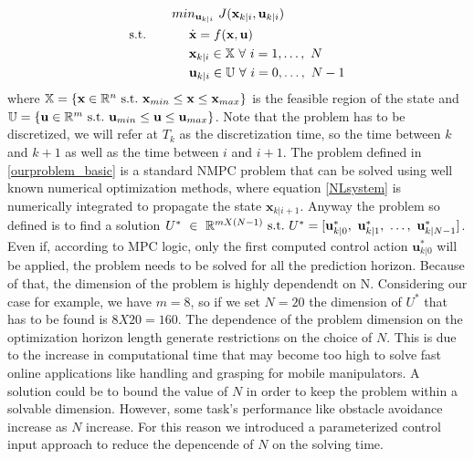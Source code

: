 \begin{equation} \label{ourproblem_basic}
\begin{split}
		& min_{\textbf{u}_{k|i}}\ J(\textbf{x}_{k|i},\textbf{u}_{k|i}) \\
		\textnormal{s.t.}\qquad
		&\ \ \ \ \dot{\textbf{x}}=f(\textbf{x},\textbf{u}) \\
		&\ \ \ \ \textbf{x}_{k|i} \in \mathbb{X}\ \forall\ i=1,\dots,\ N  \\
		&\ \ \ \ \textbf{u}_{k|i} \in \mathbb{U}\ \forall\ i=0,\dots,\ N-1 \\
	\end{split}	
\end{equation}
where $\mathbb{X} = \lbrace \textbf{x}\in \mathbb{R}^n\ \textnormal{s.t.}\ \textbf{x}_{min}\leq\textbf{x}\leq\textbf{x}_{max} \rbrace $ is the feasible region of the state and $\mathbb{U} = \lbrace \textbf{u}\in \mathbb{R}^m\ \textnormal{s.t.}\ \textbf{u}_{min}\leq\textbf{u}\leq\textbf{u}_{max} \rbrace $.
Note that the problem has to be discretized, we will refer at $T_k$ as the discretization time, so the time between $k$ and $k+1$ as well as the time between $i$ and $i+1$.
The problem defined in \ref{ourproblem_basic} is a standard NMPC problem that can be solved using well known numerical optimization methods, where equation \ref{NLsystem} is numerically integrated to propagate the state $\textbf{x}_{k|i+1}$. Anyway the problem so defined is to find a solution $U^*\ \in\ \mathbb{R}^{mX(N-1)}\ \textnormal{s.t.}\ U^* =[\textbf{u}^*_{k|0},\ \textbf{u}^*_{k|1},\ \dots,\ \textbf{u}^*_{k|N-1}]$. Even if, according to MPC logic, only the first computed control action $\textbf{u}^*_{k|0}$ will be applied, the problem needs to be solved for all the prediction horizon. Because of that, the dimension of the problem is highly dependendt on N. Considering our case for example, we have $m=8$, so if we set $N=20$ the dimension of $U^*$ that has to be found is $8X20=160$. The dependence of the problem dimension on the optimization horizon length generate restrictions on the choice of $N$. This is due to the increase in computational time that may become too high to solve fast online applications like handling and grasping for mobile manipulators. A solution could be to bound the value of $N$ in order to keep the problem within a solvable dimension. However, some task's performance like obstacle avoidance increase as $N$ increase. For this reason we introduced a parameterized control input approach to reduce the depencende of $N$ on the solving time.

